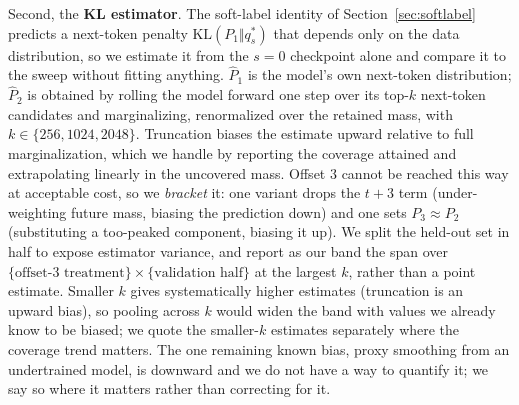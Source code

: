 Second, the \textbf{KL estimator}. The soft-label identity of
Section~\ref{sec:softlabel} predicts a next-token penalty
$\mathrm{KL}(P_1 \Vert q^{*}_s)$ that depends only on the data distribution, so we
estimate it from the $s{=}0$ checkpoint alone and compare it to the sweep without
fitting anything. $\hat{P}_1$ is the model's own next-token distribution;
$\hat{P}_2$ is obtained by rolling the model forward one step over its top-$k$
next-token candidates and marginalizing, renormalized over the retained mass, with
$k \in \{256, 1024, 2048\}$. Truncation biases the estimate upward relative to full
marginalization, which we handle by reporting the coverage attained and extrapolating
linearly in the uncovered mass. Offset $3$ cannot be reached this way at acceptable cost, so we
\emph{bracket} it: one variant drops the $t{+}3$ term (under-weighting future mass,
biasing the prediction down) and one sets $P_3 \approx P_2$ (substituting a
too-peaked component, biasing it up). We split the held-out set in half to expose estimator
variance, and report as our band the span over
$\{\text{offset-3 treatment}\} \times \{\text{validation half}\}$ at the largest $k$,
rather than a point estimate. Smaller $k$ gives systematically higher estimates
(truncation is an upward bias), so pooling across $k$ would widen the band with
values we already know to be biased; we quote the smaller-$k$ estimates separately
where the coverage trend matters. The one remaining known bias, proxy smoothing from an
undertrained model, is downward and we do not have a way to quantify it; we say so
where it matters rather than correcting for it.

